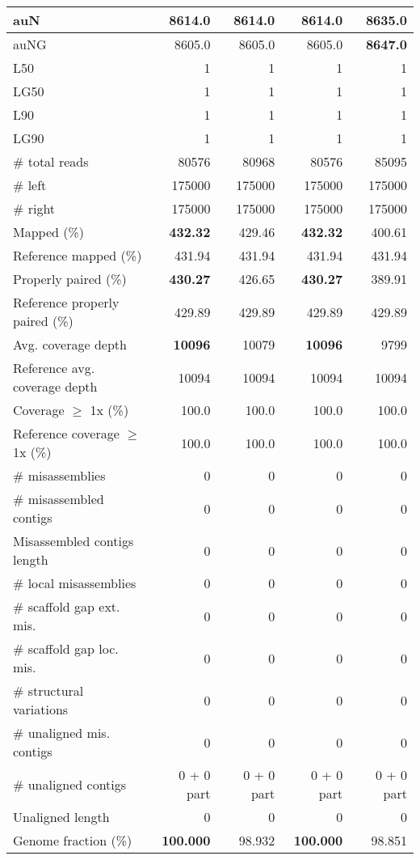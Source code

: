 \documentclass[12pt,a4paper]{article}
\begin{document}
\begin{table}[ht]
\begin{center}
\begin{tabular}{|l*{4}{|r}|}
auN & 8614.0 & 8614.0 & 8614.0 & {\bf 8635.0} \\ \hline
auNG & 8605.0 & 8605.0 & 8605.0 & {\bf 8647.0} \\ \hline
L50 & 1 & 1 & 1 & 1 \\ \hline
LG50 & 1 & 1 & 1 & 1 \\ \hline
L90 & 1 & 1 & 1 & 1 \\ \hline
LG90 & 1 & 1 & 1 & 1 \\ \hline
\# total reads & 80576 & 80968 & 80576 & 85095 \\ \hline
\# left & 175000 & 175000 & 175000 & 175000 \\ \hline
\# right & 175000 & 175000 & 175000 & 175000 \\ \hline
Mapped (\%) & {\bf 432.32} & 429.46 & {\bf 432.32} & 400.61 \\ \hline
Reference mapped (\%) & 431.94 & 431.94 & 431.94 & 431.94 \\ \hline
Properly paired (\%) & {\bf 430.27} & 426.65 & {\bf 430.27} & 389.91 \\ \hline
Reference properly paired (\%) & 429.89 & 429.89 & 429.89 & 429.89 \\ \hline
Avg. coverage depth & {\bf 10096} & 10079 & {\bf 10096} & 9799 \\ \hline
Reference avg. coverage depth & 10094 & 10094 & 10094 & 10094 \\ \hline
Coverage $\geq$ 1x (\%) & 100.0 & 100.0 & 100.0 & 100.0 \\ \hline
Reference coverage $\geq$ 1x (\%) & 100.0 & 100.0 & 100.0 & 100.0 \\ \hline
\# misassemblies & 0 & 0 & 0 & 0 \\ \hline
\# misassembled contigs & 0 & 0 & 0 & 0 \\ \hline
Misassembled contigs length & 0 & 0 & 0 & 0 \\ \hline
\# local misassemblies & 0 & 0 & 0 & 0 \\ \hline
\# scaffold gap ext. mis. & 0 & 0 & 0 & 0 \\ \hline
\# scaffold gap loc. mis. & 0 & 0 & 0 & 0 \\ \hline
\# structural variations & 0 & 0 & 0 & 0 \\ \hline
\# unaligned mis. contigs & 0 & 0 & 0 & 0 \\ \hline
\# unaligned contigs & 0 + 0 part & 0 + 0 part & 0 + 0 part & 0 + 0 part \\ \hline
Unaligned length & 0 & 0 & 0 & 0 \\ \hline
Genome fraction (\%) & {\bf 100.000} & 98.932 & {\bf 100.000} & 98.851 \\ \hline

\end{tabular}
\end{center}
\end{table}
\end{document}
